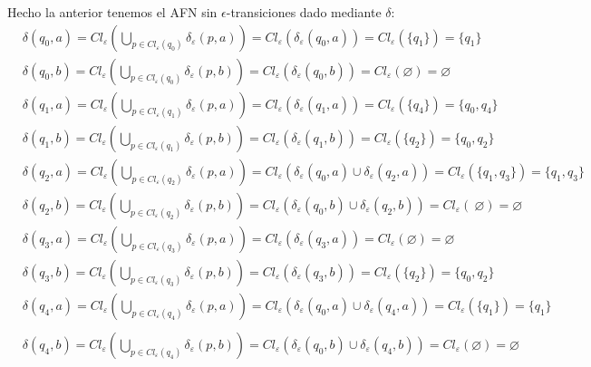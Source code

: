 \documentclass{article}
\begin{document}
\begin{enumerate}
        Hecho la anterior tenemos el AFN sin $\epsilon$-transiciones dado mediante $\delta$:
        \begin{align*}
        &\delta(q_0, a) = Cl_{\varepsilon}(\bigcup_{p \in Cl_{\varepsilon}(q_0)} \delta_{\varepsilon}(p,a)) = Cl_\varepsilon(\delta_\varepsilon(q_0,a)) = Cl_\varepsilon(\{q_1\}) = \{q_1\} \\
        &\delta(q_0, b) = Cl_{\varepsilon}(\bigcup_{p \in Cl_{\varepsilon}(q_0)} \delta_{\varepsilon}(p,b)) = Cl_\varepsilon(\delta_\varepsilon(q_0,b)) = Cl_\varepsilon (\varnothing) = \varnothing\\
        &\delta(q_1, a) = Cl_{\varepsilon}(\bigcup_{p \in Cl_{\varepsilon}(q_1)} \delta_{\varepsilon}(p,a)) = Cl_\varepsilon(\delta_\varepsilon(q_1,a)) = Cl_\varepsilon(\{q_4\}) = \{q_0, q_4\} \\
        &\delta(q_1, b) = Cl_{\varepsilon}(\bigcup_{p \in Cl_{\varepsilon}(q_1)} \delta_{\varepsilon}(p,b)) = Cl_\varepsilon(\delta_\varepsilon(q_1,b)) = Cl_\varepsilon(\{q_2\}) = \{q_0, q_2\} \\
        &\delta(q_2, a) = Cl_{\varepsilon}(\bigcup_{p \in Cl_{\varepsilon}(q_2)} \delta_{\varepsilon}(p,a)) = Cl_\varepsilon(\delta_\varepsilon(q_0,a) \cup \delta_\varepsilon(q_2, a)) = Cl_\varepsilon(\{q_1, q_3\}) = \{q_1, q_3\} \\
        &\delta(q_2, b) = Cl_{\varepsilon}(\bigcup_{p \in Cl_{\varepsilon}(q_2)} \delta_{\varepsilon}(p,b)) = Cl_\varepsilon(\delta_\varepsilon(q_0,b) \cup \delta_\varepsilon(q_2, b)) = Cl_\varepsilon(\ \varnothing ) = \varnothing\\
        &\delta(q_3, a) = Cl_{\varepsilon}(\bigcup_{p \in Cl_{\varepsilon}(q_3)} \delta_{\varepsilon}(p,a)) = Cl_\varepsilon(\delta_\varepsilon(q_3,a)) = Cl_\varepsilon(\varnothing) = \varnothing \\
        &\delta(q_3, b) = Cl_{\varepsilon}(\bigcup_{p \in Cl_{\varepsilon}(q_3)} \delta_{\varepsilon}(p,b)) = Cl_\varepsilon(\delta_\varepsilon(q_3,b)) = Cl_\varepsilon(\{q_2\}) = \{q_0, q_2\} \\
        &\delta(q_4, a) = Cl_{\varepsilon}(\bigcup_{p \in Cl_{\varepsilon}(q_4)} \delta_{\varepsilon}(p,a)) = Cl_\varepsilon(\delta_\varepsilon(q_0,a) \cup \delta_\varepsilon(q_4, a)) = Cl_\varepsilon(\{q_1\}) = \{q_1\} \\
        \end{align*}
        \begin{align*}
        &\delta(q_4, b) = Cl_{\varepsilon}(\bigcup_{p \in Cl_{\varepsilon}(q_4)} \delta_{\varepsilon}(p,b)) = Cl_\varepsilon(\delta_\varepsilon(q_0,b) \cup \delta_\varepsilon(q_4, b)) = Cl_\varepsilon(\varnothing) = \varnothing \\
        \end{align*}


\end{enumerate}
\end{document}

